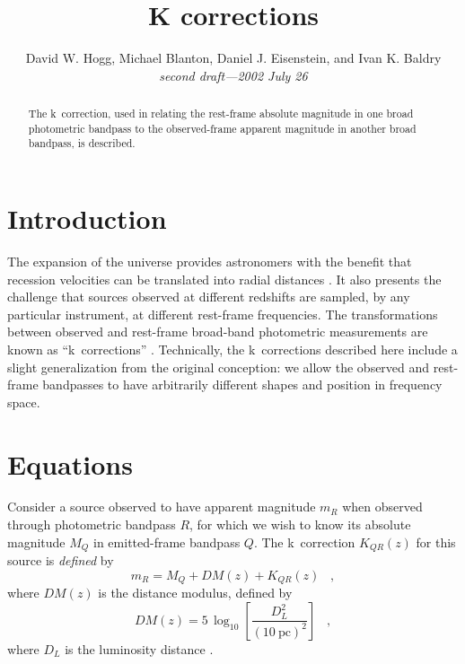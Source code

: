 \documentclass[preprint]{aastex}
\begin{document}
\title{K corrections}
\author{
  David W. Hogg,
  Michael Blanton,
  Daniel J. Eisenstein,
  and Ivan K. Baldry\\
  \textsl{second draft---2002 July 26}
}

\begin{abstract}
The k~correction, used in relating the rest-frame absolute magnitude
in one broad photometric bandpass to the observed-frame apparent
magnitude in another broad bandpass, is described.
\end{abstract}

\section{Introduction}

The expansion of the universe provides astronomers with the benefit
that recession velocities can be translated into radial distances
\citep[eg,][and references therein]{hogg99cosm}.  It also presents the
challenge that sources observed at different redshifts are sampled,
by any particular instrument, at different rest-frame frequencies.
The transformations between observed and rest-frame broad-band
photometric measurements are known as ``k~corrections''
\citep{oke68a}.  Technically, the k~corrections described here include
a slight generalization from the original conception: we allow the
observed and rest-frame bandpasses to have arbitrarily different
shapes and position in frequency space.

\section{Equations}

Consider a source observed to have apparent magnitude $m_R$ when
observed through photometric bandpass $R$, for which we wish to know
its absolute magnitude $M_Q$ in emitted-frame bandpass $Q$.  The
k~correction $K_{QR}(z)$ for this source is \emph{defined} by
\begin{equation}
\label{eq:definition}
m_R = M_Q + DM(z) + K_{QR}(z) \;\;\;,
\end{equation}
where $DM(z)$ is the distance modulus, defined by
\begin{equation}
DM(z) = 5\,\log_{10}\left[\frac{D_L^2}{(10~\mathrm{pc})^2}\right] \;\;\;,
\end{equation}
where $D_L$ is the luminosity distance \citep[eg,][]{hogg99cosm}.
\end{document}
